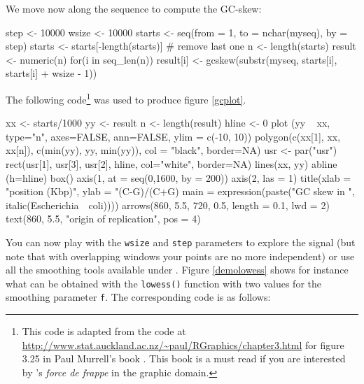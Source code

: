 \documentclass{article}
\begin{document}
We move now along the sequence to compute the GC-skew:

\begin{Schunk}
\begin{Sinput}
 step <- 10000
 wsize <- 10000
 starts <- seq(from = 1, to = nchar(myseq), by = step)
 starts <- starts[-length(starts)] # remove last one
 n <- length(starts)
 result <- numeric(n)
 for(i in seq_len(n)){
 	result[i] <- gcskew(substr(myseq, starts[i], starts[i] + wsize - 1))
 }
\end{Sinput}
\end{Schunk}

The following code\footnote{%
This code is adapted from the code at \url{http://www.stat.auckland.ac.nz/~paul/RGraphics/chapter3.html} for
figure 3.25 in Paul Murrell's book \cite{MurrellP2005}. This book is a must read if you are interested
by \Rlogo{}'s \textit{force de frappe} in the graphic domain. 
} was used to produce figure \ref{gcplot}.

\begin{Schunk}
\begin{Sinput}
 xx <- starts/1000
 yy <- result
 n <- length(result)
 hline <- 0
 plot (yy ~ xx, type="n", axes=FALSE, ann=FALSE, ylim = c(-10, 10))
 polygon(c(xx[1], xx, xx[n]), c(min(yy), yy, min(yy)), col = "black", border=NA)
 usr <- par("usr")
 rect(usr[1], usr[3], usr[2], hline, col="white", border=NA)
 lines(xx, yy)
 abline (h=hline)
 box()
 axis(1, at = seq(0,1600, by = 200))
 axis(2, las = 1) 
 title(xlab = "position (Kbp)", ylab = "(C-G)/(C+G) %
 main = expression(paste("GC skew in ", italic(Escherichia~~coli))))
 arrows(860, 5.5, 720, 0.5, length = 0.1, lwd = 2)
 text(860, 5.5, "origin of replication", pos = 4)
\end{Sinput}
\end{Schunk}

\begin{figure}
\centering{}
\end{figure}

You can now play with the \texttt{wsize} and \texttt{step} parameters
to explore the signal (but note that with overlapping windows your
points are no more independent) or use all the smoothing tools
available under \Rlogo{}. Figure \ref{demolowess} shows for instance 
what can be obtained with the \texttt{lowess()} function with two
values for the smoothing parameter \texttt{f}. The corresponding code
is as follows:
\end{document}
